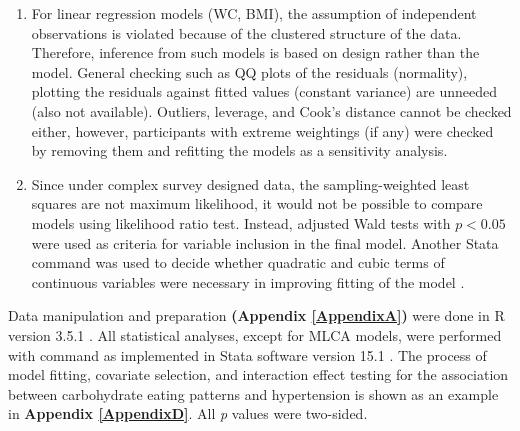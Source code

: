 \begin{enumerate}
	\item For linear regression models (WC, BMI), the assumption of independent observations is violated because of the clustered structure of the data. Therefore, inference from such models is based on design rather than the model.  
	General checking such as QQ plots of the residuals (normality), plotting the residuals against fitted values (constant variance) are unneeded (also not available). Outliers, leverage, and Cook's distance cannot be checked either, however, participants with extreme weightings (if any) were checked by removing them and refitting the models as a sensitivity analysis.
	\item Since under complex survey designed data, the sampling-weighted least squares are not maximum likelihood, it would not be possible to compare models using likelihood ratio test. Instead, adjusted Wald tests with $p < 0.05$ were used as criteria for variable inclusion in the final model. Another Stata command  was used to decide whether quadratic and cubic terms of continuous variables were necessary in improving fitting of the model \parencite{pregibon1980goodness}. 
\end{enumerate}

Data manipulation and preparation \textbf{(Appendix \ref{AppendixA})} were done in R version 3.5.1 \parencite{R3.5.1}. All statistical analyses, except for MLCA models, were performed with  command as implemented in Stata software version 15.1 \parencite{stata15}. The process of model fitting, covariate selection, and interaction effect testing for the association between carbohydrate eating patterns and hypertension is shown as an example in \textbf{Appendix \ref{AppendixD}}. All \textit{p} values were two-sided.
